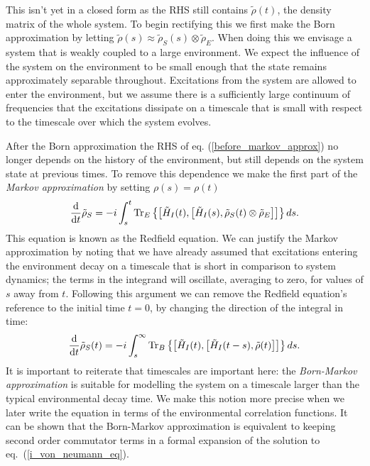 This isn't yet in a closed form as the RHS still contains $\tilde{\rho}(t)$, the density matrix of the whole system. To begin rectifying this we first make the Born approximation by letting $\tilde{\rho}(s) \approx \tilde{\rho}_S(s) \otimes \tilde{\rho}_E$. When doing this we envisage a system that is weakly coupled to a large environment. We expect the influence of the system on the environment to be small enough that the state remains approximately separable throughout. Excitations from the system are allowed to enter the environment, but we assume there is a sufficiently large continuum of frequencies that the excitations dissipate on a timescale that is small with respect to the timescale over which the system evolves. 

After the Born approximation the RHS of eq. (\ref{before_markov_approx}) no longer depends on the history of the environment, but still depends on the system state at previous times. To remove this dependence we make the first part of the \textit{Markov approximation} by setting $\rho(s) = \rho(t)$
\begin{align}
  \frac{\mathrm{d}}{\mathrm{d}t} \tilde{\rho}_S = -i \int_{s}^t \operatorname{Tr}_E\left\{\left[ \tilde{H}_I(t), \left[ \tilde{H}_I(s), \tilde{\rho}_S(t)\otimes\tilde{\rho}_E \right] \right]\right\} ds.
\end{align}
This equation is known as the Redfield equation. We can justify the Markov approximation by noting that we have already assumed that excitations entering the environment decay on a timescale that is short in comparison to system dynamics; the terms in the integrand will oscillate, averaging to zero, for values of $s$ away from $t$. Following this argument we can remove the Redfield equation's reference to the initial time $t=0$, by changing the direction of the integral in time:
\begin{align}
  \label{redfield_eq}
  \frac{\mathrm{d}}{\mathrm{d}t} \tilde{\rho}_S(t) = -i \int_{s}^\infty \operatorname{Tr}_B\left\{\left[ \tilde{H}_I(t), \left[ \tilde{H}_I(t-s), \tilde{\rho}(t) \right] \right]\right\} ds.
\end{align}
It is important to reiterate that timescales are important here: the \textit{Born-Markov approximation} is suitable for modelling the system on a timescale larger than the typical environmental decay time. We make this notion more precise when we later write the equation in terms of the environmental correlation functions. It can be shown \cite{kok+lovett} that the Born-Markov approximation is equivalent to keeping second order commutator terms in a formal expansion of the solution to eq.~(\ref{i_von_neumann_eq}).

